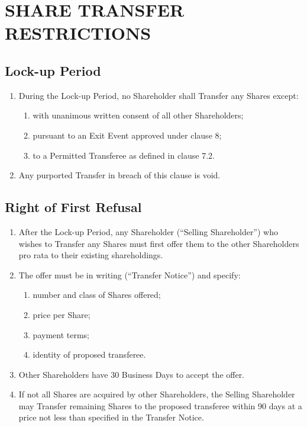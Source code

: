 \section{SHARE TRANSFER RESTRICTIONS}

\subsection{Lock-up Period}
\begin{enumerate}[label=(\alph*)]
\item During the Lock-up Period, no Shareholder shall Transfer any Shares except:
    \begin{enumerate}[label=(\roman*)]
    \item with unanimous written consent of all other Shareholders;
    \item pursuant to an Exit Event approved under clause 8;
    \item to a Permitted Transferee as defined in clause 7.2.
    \end{enumerate}
\item Any purported Transfer in breach of this clause is void.
\end{enumerate}

\subsection{Right of First Refusal}
\begin{enumerate}[label=(\alph*)]
\item After the Lock-up Period, any Shareholder (``Selling Shareholder'') who wishes to Transfer any Shares must first offer them to the other Shareholders pro rata to their existing shareholdings.
\item The offer must be in writing (``Transfer Notice'') and specify:
    \begin{enumerate}[label=(\roman*)]
    \item number and class of Shares offered;
    \item price per Share;
    \item payment terms;
    \item identity of proposed transferee.
    \end{enumerate}
\item Other Shareholders have 30 Business Days to accept the offer.
\item If not all Shares are acquired by other Shareholders, the Selling Shareholder may Transfer remaining Shares to the proposed transferee within 90 days at a price not less than specified in the Transfer Notice.
\end{enumerate}

